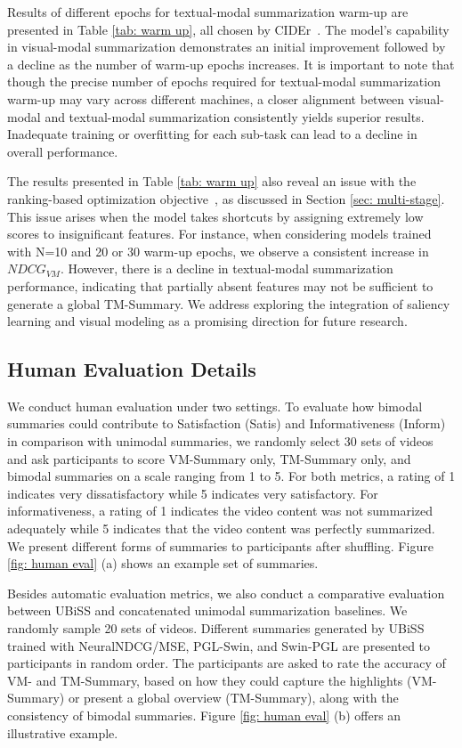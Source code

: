 Results of different epochs for textual-modal summarization warm-up are presented in Table \ref{tab: warm up}, all chosen by CIDEr~\cite{vedantam2015cider}. The model's capability in visual-modal summarization demonstrates an initial improvement followed by a decline as the number of warm-up epochs increases. It is important to note that though the precise number of epochs required for textual-modal summarization warm-up may vary across different machines, a closer alignment between visual-modal and textual-modal summarization consistently yields superior results. Inadequate training or overfitting for each sub-task can lead to a decline in overall performance.

The results presented in Table \ref{tab: warm up} also reveal an issue with the ranking-based optimization objective~\cite{Pobrotyn2021NeuralNDCG}, as discussed in Section \ref{sec: multi-stage}. This issue arises when the model takes shortcuts by assigning extremely low scores to insignificant features. For instance, when considering models trained with N=10 and 20 or 30 warm-up epochs, we observe a consistent increase in $NDCG_{VM}$. However, there is a decline in textual-modal summarization performance, indicating that partially absent features may not be sufficient to generate a global TM-Summary. We address exploring the integration of saliency learning and visual modeling as a promising direction for future research.


\subsection{Human Evaluation Details}
\label{sec: human eval}

We conduct human evaluation under two settings. To evaluate how bimodal summaries could contribute to Satisfaction (Satis) and Informativeness (Inform) in comparison with unimodal summaries, we randomly select 30 sets of videos and ask participants to score VM-Summary only, TM-Summary only, and bimodal summaries on a scale ranging from 1 to 5. For both metrics, a rating of 1 indicates very dissatisfactory while 5 indicates very satisfactory. For informativeness, a rating of 1 indicates the video content was not summarized adequately while 5 indicates that the video content was perfectly summarized. We present different forms of summaries to participants after shuffling. Figure \ref{fig: human eval} (a) shows an example set of summaries.

Besides automatic evaluation metrics, we also conduct a comparative evaluation between UBiSS and concatenated unimodal summarization baselines. We randomly sample 20 sets of videos. Different summaries generated by UBiSS trained with NeuralNDCG/MSE, PGL-Swin, and Swin-PGL are presented to participants in random order. The participants are asked to rate the accuracy of VM- and TM-Summary, based on how they could capture the highlights (VM-Summary) or present a global overview (TM-Summary), along with the consistency of bimodal summaries. Figure \ref{fig: human eval} (b) offers an illustrative example.


